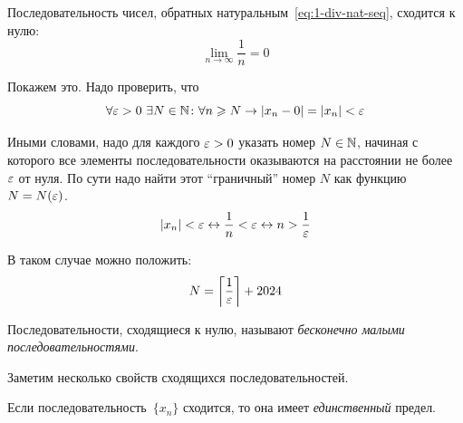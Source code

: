 \documentclass[a4paper,12pt]{article}
\begin{document}
  \begin{example}
    Последовательность чисел, обратных натуральным~\eqref{eq:1-div-nat-seq}, сходится к нулю:
    \[
      \lim_{n \to \infty} \frac{1}{n} = 0
    \]
    
    Покажем это.
    Надо проверить, что
    \[
      \forall \varepsilon > 0\ \exists N \in \mathbb N\colon \forall n \geqslant N \to |x_n - 0| = |x_n| < \varepsilon
    \]
    
    Иными словами, надо для каждого $\eps \hm> 0$ указать номер $N \hm\in \NN$, начиная с которого все элементы последовательности оказываются на расстоянии не более~$\varepsilon$ от нуля.
    По сути надо найти этот ``граничный'' номер $N$ как функцию $N \hm= N(\eps)$.
    \[
      |x_n| < \varepsilon \leftrightarrow \frac{1}{n} < \varepsilon \leftrightarrow n > \frac{1}{\varepsilon}
    \]
    
    В таком случае можно положить:
    \[
      N = \left\lceil\frac{1}{\varepsilon}\right\rceil + 2024
    \]
  \end{example}

  Последовательности, сходящиеся к нулю, называют \emph{бесконечно малыми последовательностями}.

  Заметим несколько свойств сходящихся последовательностей.
  
  \begin{proposition}
    Если последовательность~$\{x_n\}$ сходится, то она имеет \emph{единственный} предел.
  \end{proposition}
  
\end{document}
